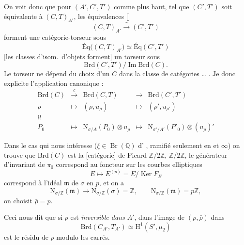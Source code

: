\documentclass[11pt,a4paper]{article}
\begin{document}
On voit donc que pour $(A', C', T')$ comme plus haut,
 tel que $(C', T')$ soit équivalente à
$(C, T)_{A'}$, les équivalences []
\[
  (C, T)_{A'} \xrightarrow{\ \sim\ } (C', T')
\]
forment une \struck{\ill{}} catégorie-torseur sous
\[
  \text{Éq}\bigl((C, T)_{A'}\bigr) \simeq
  \text{Éq}(C', T')
\]
[les classes d'isom.\ d'objets forment] un torseur sous
\[
  \mathrm{Brd}(C', T') / \operatorname{Im} \mathrm{Brd}(C).
\]
Le torseur ne dépend \ill{} du choix d'un $C$ dans la classe de catégories
\ill{} … . Je \ill{} donc explicite l'application canonique \ill{} :
\[
  \begin{array}{ccccc}
    \mathrm{Brd}(C) & \xrightarrow{\ c\ } & \mathrm{Brd}(C, T) &
      \longrightarrow & \mathrm{Brd}(C', T') \\
    \rho & \longmapsto & (\rho, u_{\rho}) & \longmapsto &
      (\rho', u_{\rho'}) \\
    \wr\!\wr \\
    P_{0} & \longmapsto & \mathrm{N}_{\sigma/A}(P_{0}) \otimes u_{\rho} &
      \longmapsto & \mathrm{N}_{\sigma'/A'}(P'_{0}) \otimes (u_{\rho})'
  \end{array}
\]

Dans le cas qui nous intéresse ($\xi \in \operatorname{Br}(\mathbb{Q})$
d' \ill{}, ramifié seulement en  et $\infty$)
\struck{\ill{} \ill{}} on trouve que $\mathrm{Brd}(C)$ est la
 [catégorie] de Picard $\mathbb{Z}/2\mathbb{Z}$,
$\mathbb{Z}/2\mathbb{Z}$, le générateur 
d'invariant \ill{} de $\pi_{0}$  correspond au
 foncteur sur les courbes elliptiques
\[
  E \longmapsto E^{(p)} = E/\operatorname{Ker} F_{E}
\]
correspond à l'idéal  $\mathfrak{m}$ de $\sigma$ en $p$,
et on a
\[
  \mathrm{N}_{\sigma/\mathbb{Z}}(\mathfrak{m}) \longrightarrow
  \mathrm{N}_{\sigma/\mathbb{Z}}(\sigma) = \mathbb{Z}, \qquad
  \mathrm{N}_{\sigma/\mathbb{Z}}(\mathfrak{m}) = p\mathbb{Z},
\]
on choisit $\bar{\rho} = p$.

Ceci nous dit que si $p$ est \emph{inversible dans $A'$}, dans l'image de
$(\rho, \bar{\rho})$ dans
\[
  \mathrm{Brd}(C_{A'}, T_{A'}) \simeq \mathrm{H}^{1}(S', \mu_{2})
\]
\struck{\ill{}} est le résidu de $p$ modulo les carrés.
\end{document}
